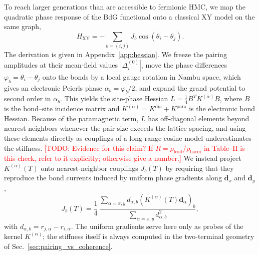 \documentclass[aps,prb,twocolumn,superscriptaddress,floatfix]{revtex4-2}
\newcommand{\todo}[1]{\textcolor{red}{[TODO: #1]}}
\begin{document}
To reach larger generations than are accessible to fermionic HMC, we map the
quadratic phase response of the BdG functional onto a classical XY model on
the same graph,
\begin{equation}
H_{\mathrm{XY}} = -\sum_{b=(i,j)} J_b \cos(\theta_i - \theta_j).
\label{eq:rung_B_H}
\end{equation}
The derivation is given in Appendix~\ref{app:hessian}. We freeze the pairing
amplitudes at their mean-field values $|\Delta_i^{(0)}|$, move the phase
differences $\varphi_b = \theta_i - \theta_j$ onto the bonds by a local gauge
rotation in Nambu space, which gives an electronic Peierls phase
$\alpha_b = \varphi_b/2$, and expand the grand potential to second order in
$\alpha_b$. This yields the site-phase Hessian
$L = \frac{1}{4}B^T K^{(\alpha)} B$, where $B$ is the bond--site incidence
matrix and $K^{(\alpha)} = K^{\mathrm{dia}} + K^{\mathrm{para}}$ is the
electronic bond Hessian. Because of the paramagnetic term, $L$ has
off-diagonal elements beyond nearest neighbors whenever the pair size exceeds
the lattice spacing, and using these elements directly as couplings of a
long-range cosine model underestimates the stiffness.
\todo{Evidence for this claim? If $R=\rho_{\mathrm{lead}}/\rho_{\mathrm{harm}}$
in Table~II is this check, refer to it explicitly; otherwise give a number.}
We instead project $K^{(\alpha)}(T)$ onto nearest-neighbor couplings $J_b(T)$
by requiring that they reproduce the bond currents induced by uniform phase
gradients along $\bm{d}_x$ and $\bm{d}_y$,
\begin{equation}
J_b(T) = \frac{1}{4}\,\frac{\sum_{\alpha=x,y} d_{\alpha,b}\left(K^{(\alpha)}(T)\bm{d}_\alpha\right)_b}{\sum_{\alpha=x,y} d_{\alpha,b}^2},
\label{eq:Jb_projection}
\end{equation}
with $d_{\alpha,b} = r_{j,\alpha} - r_{i,\alpha}$. The uniform gradients serve
here only as probes of the kernel $K^{(\alpha)}$; the stiffness itself is
always computed in the two-terminal geometry of Sec.~\ref{sec:pairing_vs_coherence}.
\end{document}
